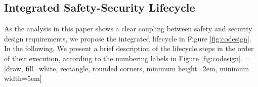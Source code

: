 \documentclass[journal]{IEEEtran}
\begin{document}
\subsection{Integrated Safety-Security Lifecycle} \label{sec:integrated-lifecycle}
As the analysis in this paper shows a clear coupling between safety and security design requirements, we propose the integrated lifecycle in Figure \ref{fig:codesign}. In the following, We present a brief description of the lifecycle steps in the order of their execution, according to the numbering labels in Figure \ref{fig:codesign}. 
 = [draw, fill=white, rectangle, rounded corners, minimum height=2em, minimum width=5em]
\end{document}
